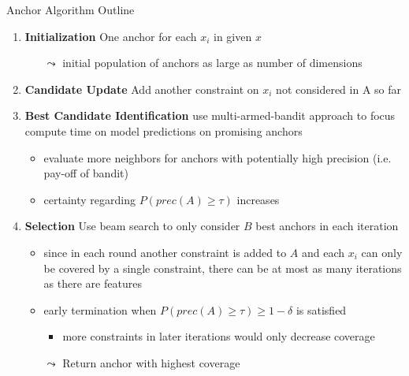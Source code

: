 \documentclass[aspectratio=169]{../latex_main/tntbeamer}  %
\begin{document}
\begin{frame}[c]{Anchor Algorithm Outline }

\begin{enumerate}

    \item \textbf{Initialization} One anchor for each $x_i$ in given $x$
    \begin{itemize}
        \item[$\leadsto$] initial population of anchors as large as number of dimensions
    \end{itemize}
    \pause
    \item \textbf{Candidate Update} Add another constraint on $x_i$ not considered in A so far
    \pause
    \item \textbf{Best Candidate Identification} use multi-armed-bandit approach to focus compute time on model predictions on promising anchors 
    \begin{itemize}
        \item evaluate more neighbors for anchors with potentially high precision (i.e. pay-off of bandit)
        \item certainty regarding $P(prec(A) \geq \tau)$ increases
    \end{itemize}
    \pause
    \item \textbf{Selection} Use beam search to only consider $B$ best anchors in each iteration 
    \begin{itemize}
        \item since in each round another constraint is added to $A$ and each $x_i$ can only be covered by a single constraint, there can be at most as many iterations as there are features
        \item early termination when $P(prec(A) \geq \tau) \geq 1 - \delta$ is satisfied
        \begin{itemize}
            \item more constraints in later iterations would only decrease coverage
        \end{itemize}
        \item[$\leadsto$] Return anchor with highest coverage 
    \end{itemize}
\end{enumerate}
\end{frame}
\end{document}
